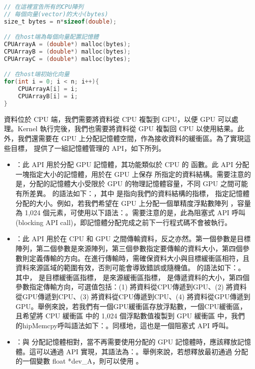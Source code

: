 \begin{lstlisting}[language=C, caption={CPU的記憶體配置}, label={5th:example}]
// 在這裡宣告所有的CPU陣列
// 每個向量(vector)的大小(bytes)
size_t bytes = n*sizeof(double);

// 在host端為每個向量配置記憶體
CPUArrayA = (double*) malloc(bytes);
CPUArrayB = (double*) malloc(bytes);
CPUArrayC = (double*) malloc(bytes);

// 在host端初始化向量
for(int i = 0; i < n; i++){
    CPUArrayA[i] = i;
    CPUArrayB[i] = i;
}
\end{lstlisting}

資料位於 CPU 端，我們需要將資料從 CPU 複製到 GPU，以便 GPU 可以處理。Kernel 執行完後，我們也需要將資料從 GPU 複製回 CPU 以使用結果。此外，我們還需要在 GPU 上分配記憶體空間，作為接收資料的緩衝區。為了實現這些目標， 提供了一組記憶體管理的 API，如下所列。

\begin{itemize}
    \item {}：此 API 用於分配 GPU 記憶體，其功能類似於 CPU 的  函數。此 API 分配一塊指定大小的記憶體，用於在 GPU 上保存  所指定的資料結構。需要注意的是，分配的記憶體大小受限於 GPU 的物理記憶體容量，不同 GPU 之間可能有所差異。 的語法如下：，其中  是指向我們的資料結構的指標， 指定記憶體分配的大小。例如，若我們希望在 GPU 上分配一個單精度浮點數陣列 ，容量為 1,024 個元素，可使用以下語法：。需要注意的是，此為阻塞式 API 呼叫 (blocking API call)，即記憶體分配完成之前下一行程式碼不會被執行。
    \item {}：此 API 用於在 CPU 和 GPU 之間傳輸資料，反之亦然。第一個參數是目標陣列，第二個參數是來源陣列，第三個參數指定要傳輸的資料大小，第四個參數則定義傳輸的方向。在進行傳輸時，需確保資料大小與目標緩衝區相符，且資料來源區域的範圍有效，否則可能會導致錯誤或隨機值。 的語法如下：。其中， 是目標緩衝區指標， 是來源緩衝區指標， 是傳遞資料的大小，第四個參數指定傳輸方向，可選值包括：(1)  將資料從CPU傳遞到GPU、(2)  將資料從GPU傳遞到CPU、(3)  將資料從CPU傳遞到CPU、(4)  將資料從GPU傳遞到GPU。舉例來說，若我們有一個GPU緩衝區存放浮點數，一個CPU緩衝區，且希望將 CPU 緩衝區  中的 1,024 個浮點數值複製到 GPU 緩衝區  中，我們的hipMemcpy呼叫語法如下：。同樣地，這也是一個阻塞式 API 呼叫。
    \item {}：與  分配記憶體相對，當不再需要使用分配的 GPU 記憶體時，應該釋放記憶體。這可以通過  API 實現，其語法為：。舉例來說，若想釋放最初通過  分配的一個變數 float *dev\_A，則可以使用 。
\end{itemize}

